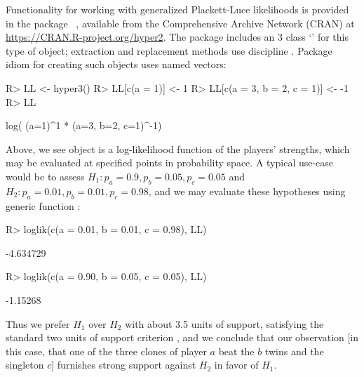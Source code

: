 \documentclass[article]{jss}
\begin{document}
Functionality for working with generalized Plackett-Luce likelihoods
is provided in the package ~\citep{hankin2017,hankin2009},
available from the Comprehensive  Archive Network (CRAN)
at \url{https://CRAN.R-project.org/hyper2}.  The package includes an
3 class `' for this type of object;
extraction and replacement methods use  discipline
\citep{hankin2022}.  Package idiom for creating such objects uses
named vectors:
%
\begin{Schunk}
\begin{Sinput}
R> LL <- hyper3()
R> LL[c(a = 1)] <- 1
R> LL[c(a = 3, b = 2, c = 1)] <- -1
R> LL
\end{Sinput}
\begin{Soutput}
log( (a=1)^1 * (a=3, b=2, c=1)^-1)
\end{Soutput}
\end{Schunk}
%
Above, we see object  is a log-likelihood function of the
players' strengths, which may be evaluated at specified points in
probability space.  A typical use-case would be to assess $H_1\colon
p_a=0.9,p_b=0.05,p_c=0.05$ and $H_2\colon p_a=0.01,p_b=0.01,p_c=0.98$,
and we may evaluate these hypotheses using generic function
:
%
\begin{Schunk}
\begin{Sinput}
R> loglik(c(a = 0.01, b = 0.01, c = 0.98), LL)
\end{Sinput}
\begin{Soutput}
[1] -4.634729
\end{Soutput}
\begin{Sinput}
R> loglik(c(a = 0.90, b = 0.05, c = 0.05), LL)
\end{Sinput}
\begin{Soutput}
[1] -1.15268
\end{Soutput}
\end{Schunk}
%
Thus we prefer $H_1$ over $H_2$ with about 3.5 units of support,
satisfying the standard two units of support
criterion \citep{edwards1972}, and we conclude that our observation
[in this case, that one of the three clones of player $a$ beat the $b$
twins and the singleton $c$] furnishes strong support against $H_2$ in
favor of $H_1$.
\end{document}

